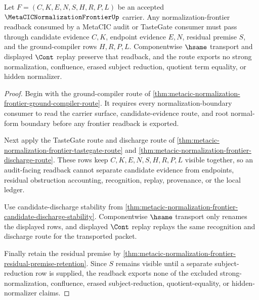 \begin{theorem}
\label{thm:metacic-normalization-frontier-ground-compiler-readback}
Let $F=(C,K,E,N,S,H,R,P,L)$ be an accepted $\MetaCICNormalizationFrontierUp$ carrier. Any normalization-frontier readback consumed by a MetaCIC audit or TasteGate consumer must pass through candidate evidence $C,K$, endpoint evidence $E,N$, residual premise $S$, and the ground-compiler rows $H,R,P,L$. Componentwise $\hsame$ transport and displayed $\Cont$ replay preserve that readback, and the route exports no strong normalization, confluence, erased subject reduction, quotient term equality, or hidden normalizer.
\end{theorem}
\begin{proof}
Begin with the ground-compiler route of \autoref{thm:metacic-normalization-frontier-ground-compiler-route}. It requires every normalization-boundary consumer to read the carrier surface, candidate-evidence route, and root normal-form boundary before any frontier readback is exported.

Next apply the TasteGate route and discharge route of \autoref{thm:metacic-normalization-frontier-tastegate-route} and \autoref{thm:metacic-normalization-frontier-discharge-route}. These rows keep $C,K,E,N,S,H,R,P,L$ visible together, so an audit-facing readback cannot separate candidate evidence from endpoints, residual obstruction accounting, recognition, replay, provenance, or the local ledger.

Use candidate-discharge stability from \autoref{thm:metacic-normalization-frontier-candidate-discharge-stability}. Componentwise $\hsame$ transport only renames the displayed rows, and displayed $\Cont$ replay replays the same recognition and discharge route for the transported packet.

Finally retain the residual premise by \autoref{thm:metacic-normalization-frontier-residual-premise-retention}. Since $S$ remains visible until a separate subject-reduction row is supplied, the readback exports none of the excluded strong-normalization, confluence, erased subject-reduction, quotient-equality, or hidden-normalizer claims.
\end{proof}

